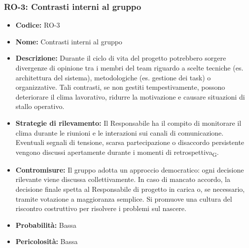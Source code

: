 ﻿\documentclass[a4paper, 10pt, colorlinks=true, linkcolor=black, urlcolor=blue, citecolor=blue, hidelinks]{article}
\begin{document}
\subsubsection{RO-3: Contrasti interni al gruppo}
\begin{itemize}
    \item \textbf{Codice:} RO-3 
    \item \textbf{Nome:} Contrasti interni al gruppo

    \item \textbf{Descrizione:} Durante il ciclo di vita del progetto potrebbero sorgere divergenze di opinione tra i membri del team riguardo a scelte tecniche (es. architettura del sistema), metodologiche (es. gestione dei task) o organizzative. Tali contrasti, se non gestiti tempestivamente, possono deteriorare il clima lavorativo, ridurre la motivazione e causare situazioni di stallo operativo.

    \item \textbf{Strategie di rilevamento:} Il Responsabile ha il compito di monitorare il clima durante le riunioni e le interazioni sui canali di comunicazione. Eventuali segnali di tensione, scarsa partecipazione o disaccordo persistente vengono discussi apertamente durante i momenti di retrospettiva\textsubscript{G}.

    \item \textbf{Contromisure:} Il gruppo adotta un approccio democratico: ogni decisione rilevante viene discussa collettivamente. In caso di mancato accordo, la decisione finale spetta al Responsabile di progetto in carica o, se necessario, tramite votazione a maggioranza semplice. Si promuove una cultura del riscontro costruttivo per risolvere i problemi sul nascere.

    \item \textbf{Probabilità:} Bassa

    \item \textbf{Pericolosità:} Bassa
\end{itemize}
\end{document}
